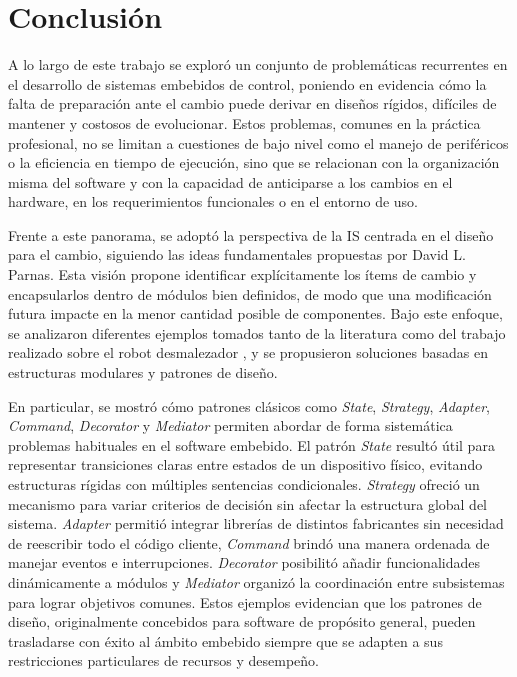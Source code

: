 \chapter{Conclusión}
\label{conclusion}

A lo largo de este trabajo se exploró un conjunto de problemáticas recurrentes en el desarrollo de sistemas embebidos de control, poniendo en evidencia cómo la falta de preparación ante el cambio puede derivar en diseños rígidos, difíciles de mantener y costosos de evolucionar. Estos problemas, comunes en la práctica profesional, no se limitan a cuestiones de bajo nivel como el manejo de periféricos o la eficiencia en tiempo de ejecución, sino que se relacionan con la organización misma del software y con la capacidad de anticiparse a los cambios en el hardware, en los requerimientos funcionales o en el entorno de uso.

Frente a este panorama, se adoptó la perspectiva de la \gls{IS} centrada en el diseño para el cambio, siguiendo las ideas fundamentales propuestas por David L. Parnas. Esta visión propone identificar explícitamente los ítems de cambio y encapsularlos dentro de módulos bien definidos, de modo que una modificación futura impacte en la menor cantidad posible de componentes. Bajo este enfoque, se analizaron diferentes ejemplos tomados tanto de la literatura \cite{douglass} como del trabajo realizado sobre el robot desmalezador \cite{paperPomponio}, y se propusieron soluciones basadas en estructuras modulares y patrones de diseño.

En particular, se mostró cómo patrones clásicos como \textit{State}, \textit{Strategy}, \textit{Adapter}, \textit{Command}, \textit{Decorator} y \textit{Mediator} permiten abordar de forma sistemática problemas habituales en el software embebido. El patrón \textit{State} resultó útil para representar transiciones claras entre estados de un dispositivo físico, evitando estructuras rígidas con múltiples sentencias condicionales. \textit{Strategy} ofreció un mecanismo para variar criterios de decisión sin afectar la estructura global del sistema. \textit{Adapter} permitió integrar librerías de distintos fabricantes sin necesidad de reescribir todo el código cliente, \textit{Command} brindó una manera ordenada de manejar eventos e interrupciones. \textit{Decorator} posibilitó añadir funcionalidades dinámicamente a módulos y \textit{Mediator} organizó la coordinación entre subsistemas para lograr objetivos comunes. Estos ejemplos evidencian que los patrones de diseño, originalmente concebidos para software de propósito general, pueden trasladarse con éxito al ámbito embebido siempre que se adapten a sus restricciones particulares de recursos y desempeño.


